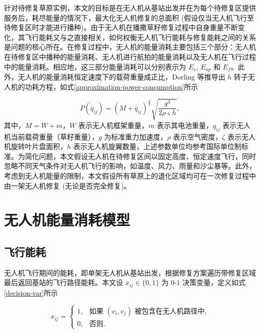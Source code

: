 \documentclass[AutoFakeBold]{LZUThesis}
\begin{document}
针对待修复草原实例，本文的目标是在无人机从基站出发并在为每个待修复区提供服务后，耗尽能量的情况下，最大化无人机修复的总面积 (假设仅当无人机飞行至待修复区时才能进行播种)。由于无人机在播撒草籽修复过程中自身重量不断变化，其飞行能耗又与之直接相关，如何权衡无人机飞行能耗与修复能耗之间的关系是问题的核心所在。在修复过程中，无人机的能量消耗主要包括三个部分：无人机在待修复区中播种的能量消耗、无人机进行航拍的能量消耗以及无人机在飞行过程中的能量消耗。相应地，这三部分能量消耗可以分别表示为 $E_s$, $E_{ap}$ 和 $E_f$。此外，无人机的能量消耗恒定速度下的载荷重量成正比，Dorling\cite{dorling2016vehicle} 等推导出 $h$ 转子无人机的功耗方程，如式\eqref{approximation-power-consumption}所示

\begin{equation} \label{approximation-power-consumption}
	P(\bar{q}_{ij}) = (M + \bar{q}_{ij})^{\frac{3}{2}}\sqrt{\frac{g^3}{2 \rho \varsigma h}},
\end{equation}
其中，$M = W + m$，$W$ 表示无人机框架重量，$m$ 表示其电池重量，$q_{ij}$ 表示无人机当前载荷重量（草籽重量），$g$ 为标准重力加速度，$\rho$ 表示空气密度，$\zeta$ 表示无人机旋转叶片盘面积，$h$ 表示无人机旋翼数量，上述参数单位均参考国际单位制标准。为简化问题，本文假设无人机在待修复区间以固定高度、恒定速度飞行，同时忽略不同天气条件对无人机飞行的影响，如温度、风力、雨量和沙尘暴等。此外，考虑到无人机能量的限制，本文假设所有草原上的退化区域均可在一次修复过程中由一架无人机修复 (无论是否完全修复)。

\section{无人机能量消耗模型}

\subsection{飞行能耗}

无人机飞行期间的能耗，即单架无人机从基站出发，根据修复方案遍历带修复区域最后返回基站的飞行路径能耗。本文设 $x_{ij} \in \{0,1\}$ 为 $0$-$1$ 决策变量，定义如式\eqref{decision-var}所示

\begin{equation}\label{decision-var}
	x_{ij} =
	\begin{cases}
		1, & \mbox{如果 $(v_i,v_j)$ 被包含在无人机路径中,} \\
		0, & \mbox{否则}.
	\end{cases}
\end{equation}
\end{document}
